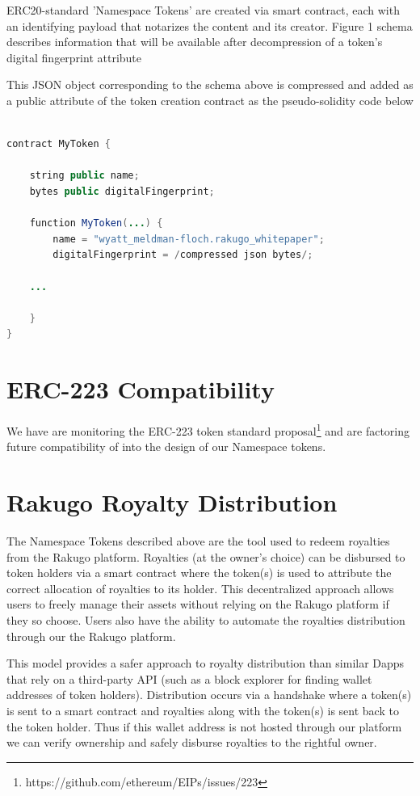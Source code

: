 \documentclass{article}
\begin{document}
ERC20-standard 'Namespace Tokens' are created via smart contract, each with an identifying payload that notarizes the content and its creator. Figure 1 schema describes information that will be available after decompression of a token’s digital fingerprint attribute

This JSON object corresponding to the schema above is compressed and added as a public attribute of the token creation contract as the pseudo-solidity code below

\begin{minipage}{\linewidth}
\begin{lstlisting}[language=java]

contract MyToken {

    string public name;
    bytes public digitalFingerprint;

    function MyToken(...) {
        name = "wyatt_meldman-floch.rakugo_whitepaper";
        digitalFingerprint = /compressed json bytes/;
        
    ...
    
    }
}
\end{lstlisting}
\end{minipage}

\section{ERC-223 Compatibility}
We have are monitoring the ERC-223 token standard proposal\footnote{https://github.com/ethereum/EIPs/issues/223} and are factoring future compatibility of into the design of our Namespace tokens.

\section{Rakugo Royalty Distribution}

The Namespace Tokens described above are the tool used to redeem royalties from the Rakugo platform. Royalties (at the owner's choice) can be disbursed to token holders via a smart contract where the token(s) is used to attribute the correct allocation of royalties to its holder. This decentralized approach allows users to freely manage their assets without relying on the Rakugo platform if they so choose. Users also have the ability to automate the royalties distribution through our the Rakugo platform.

This model provides a safer approach to royalty distribution than similar Dapps that rely on a third-party API (such as a block explorer for finding wallet addresses of token holders). Distribution occurs via a handshake where a token(s) is sent to a smart contract and royalties along with the token(s) is sent back to the token holder. Thus if this wallet address is not hosted through our platform we can verify ownership and safely disburse royalties to the rightful owner.
\end{document}
